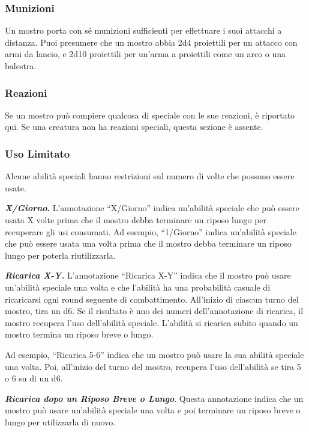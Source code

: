 \subsubsection{Munizioni}

Un mostro porta con sé munizioni sufficienti per effettuare i suoi attacchi a distanza. Puoi presumere che un mostro abbia 2d4 proiettili per un attacco con armi da lancio, e 2d10 proiettili per un'arma a proiettili come un arco o una balestra.

\subsubsection{Reazioni}

Se un mostro può compiere qualcosa di speciale con le sue reazioni, è riportato qui. Se una creatura non ha reazioni speciali, questa sezione è assente.

\subsubsection{Uso Limitato}

Alcune abilità speciali hanno restrizioni sul numero di volte che
possono essere usate.

\textbf{\emph{X/Giorno}.} L'annotazione ``X/Giorno'' indica un'abilità
speciale che può essere usata X volte prima che il mostro debba
terminare un riposo lungo per recuperare gli usi consumati. Ad esempio,
``1/Giorno'' indica un'abilità speciale che può essere usata una volta
prima che il mostro debba terminare un riposo lungo per poterla
riutilizzarla.

\emph{\textbf{Ricarica X-Y.}} L'annotazione ``Ricarica X-Y'' indica che
il mostro può usare un'abilità speciale una volta e che l'abilità ha una
probabilità casuale di ricaricarsi ogni round seguente di combattimento.
All'inizio di ciascun turno del mostro, tira un d6. Se il risultato è
uno dei numeri dell'annotazione di ricarica, il mostro recupera l'uso
dell'abilità speciale. L'abilità si ricarica subito quando un mostro
termina un riposo breve o lungo.

Ad esempio, ``Ricarica 5-6'' indica che un mostro può usare la sua
abilità speciale una volta. Poi, all'inizio del turno del mostro,
recupera l'uso dell'abilità se tira 5 o 6 su di un d6.

\emph{\textbf{Ricarica dopo un Riposo Breve o Lungo}}. Questa
annotazione indica che un mostro può usare un'abilità speciale una volta
e poi terminare un riposo breve o lungo per utilizzarla di nuovo.

